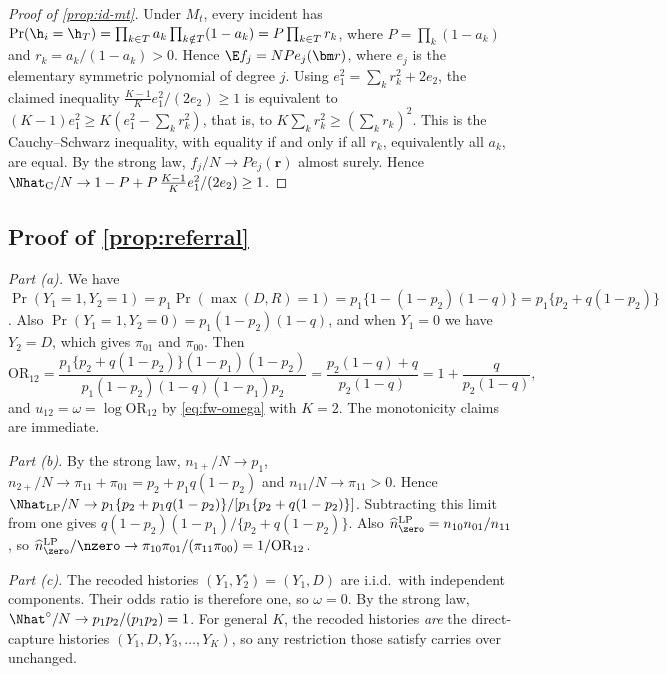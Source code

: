 \begin{proof}[Proof of \cref{prop:id-mt}]
Under $M_t$, every incident has $\Pr(\h_i=\h_T)=\prod_{k\in T}a_k\prod_{k\notin T}(1-a_k)=P\prod_{k\in T}r_k$, where $P=\prod_k(1-a_k)$ and $r_k=a_k/(1-a_k)>0$. Hence $\E f_j=NPe_j(\bm r)$, where $e_j$ is the elementary symmetric polynomial of degree $j$. Using $e_1^2=\sum_kr_k^2+2e_2$, the claimed inequality $\frac{K-1}{K}e_1^2/(2e_2)\ge1$ is equivalent to $(K-1)e_1^2\ge K(e_1^2-\sum_kr_k^2)$, that is, to $K\sum_kr_k^2\ge(\sum_kr_k)^2$. This is the Cauchy--Schwarz inequality, with equality if and only if all $r_k$, equivalently all $a_k$, are equal. By the strong law, $f_j/N\to Pe_j(\bm r)$ almost surely. Hence $\Nhat_{\mathrm C}/N\to1-P+P\,\frac{K-1}{K}e_1^2/(2e_2)\ge1$.
\end{proof}

\subsection{Proof of \texorpdfstring{\cref{prop:referral}}{the referral proposition}}\label{app:id-referral}

\emph{Part (a).} We have $\Pr(Y_1=1,Y_2=1)=p_1\Pr(\max(D,R)=1)=p_1\{1-(1-p_2)(1-q)\}=p_1\{p_2+q(1-p_2)\}$. Also $\Pr(Y_1=1,Y_2=0)=p_1(1-p_2)(1-q)$, and when $Y_1=0$ we have $Y_2=D$, which gives $\pi_{01}$ and $\pi_{00}$. Then
\[
  \mathrm{OR}_{12}=\frac{p_1\{p_2+q(1-p_2)\}(1-p_1)(1-p_2)}{p_1(1-p_2)(1-q)(1-p_1)p_2}
  =\frac{p_2(1-q)+q}{p_2(1-q)}=1+\frac{q}{p_2(1-q)},
\]
and $u_{12}=\omega=\log\mathrm{OR}_{12}$ by \eqref{eq:fw-omega} with $K=2$. The monotonicity claims are immediate.

\emph{Part (b).} By the strong law, $n_{1+}/N\to p_1$, $n_{2+}/N\to\pi_{11}+\pi_{01}=p_2+p_1q(1-p_2)$ and $n_{11}/N\to\pi_{11}>0$. Hence
$\Nhat_{\mathrm{LP}}/N\to p_1\{p_2+p_1q(1-p_2)\}/[p_1\{p_2+q(1-p_2)\}]$.
Subtracting this limit from one gives $q(1-p_2)(1-p_1)/\{p_2+q(1-p_2)\}$. Also $\widehat n_{\zero}^{\mathrm{LP}}=n_{10}n_{01}/n_{11}$, so $\widehat n_{\zero}^{\mathrm{LP}}/\nzero\to\pi_{10}\pi_{01}/(\pi_{11}\pi_{00})=1/\mathrm{OR}_{12}$.

\emph{Part (c).} The recoded histories $(Y_1,Y_2^\circ)=(Y_1,D)$ are i.i.d.\ with independent components. Their odds ratio is therefore one, so $\omega=0$. By the strong law, $\Nhat^\circ/N\to p_1p_2/(p_1p_2)=1$. For general $K$, the recoded histories \emph{are} the direct-capture histories $(Y_1,D,Y_3,\dots,Y_K)$, so any restriction those satisfy carries over unchanged.

